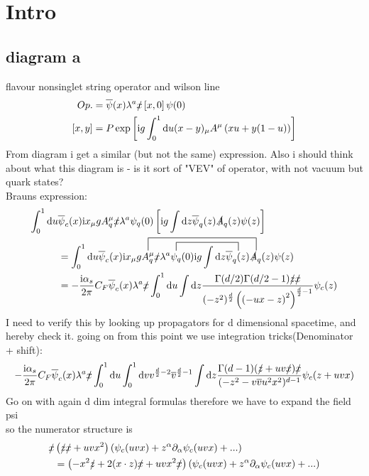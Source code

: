 \section{Intro}
\subsection{diagram a}
flavour nonsinglet string operator and wilson line
\begin{align}
	Op. 
	&= \overline\psi (x) \lambda^a \slashed x \left[x,0 \right] \psi (0)
	\\
	\left[x,y \right] 
	&= P \exp\left[\text{i} g \int_0^1 \text{d} u (x-y)_\mu A^\mu\left(xu+y(1-u)\right)\right]
\end{align}
From diagram i get a similar (but not the same) expression. Also i should think about what this diagram is - is it sort of "VEV" of operator, with not vacuum but quark states?
\\
Brauns expression:
\begin{align}
	\int_{0}^{1}\dx u & \psibarc(x) \imag x_\mu g A_q^\mu \slashed x \lambda^a \psiq(0) \left[\imag g \int \dx z \psibarq (z) \slashed A_q(z) \psi(z) \right]
	\\
	&=
	\int_{0}^{1}\dx u \psibarc(x) \imag x_\mu g 
	\contraction[3ex]{}{A_q^\mu}{\slashed x \lambda^a \psiq(0) \imag g \int \dx z \psibarq (z)}{\slashed A_q}
	\contraction[2ex]{A_q^\mu \slashed x \lambda^a }{\psiq}{(0) \imag g \int \dx z }{\psibarq (z)}
	A_q^\mu \slashed x \lambda^a \psiq(0) \imag g \int \dx z \psibarq (z) \slashed A_q(z) \psi(z)
	\\
	&=
	-\frac{\imag \as}{2\pi} C_F \psibarc(x) \lambda^a \slashed x \int _0 ^1 \dx u \int \dx z \frac{ \Gamma(d/2) \Gamma(d/2-1) \slashed z \slashed x}{(-z^2)^{\frac{d}{2}}\left(\left(-ux-z\right)^2\right)^{\frac{d}{2}-1}}\psic(z)
\end{align}
I need to verify this by looking up propagators for d dimensional spacetime, and hereby check it. going on from this point we use integration tricks(Denominator + shift):
\begin{align}
	-\frac{\text{i} \alpha_s}{2\pi} C_F \overline\psi_c(x) \lambda^a \slashed x \int _0 ^1 \text{d} u \int_0^1 \text{d} v v^{\frac{d}{2}-2} \overline v ^{\frac{d}{2}-1}\int \text{d} z \frac{ \Gamma(d-1) (\slashed z+uv\slashed x) \slashed x}{(-z^2 -v \overline v u^2 x^2)^{d-1}}\psi_c(z+uvx)
\end{align}
Go on with again d dim integral formulas
therefore we have to expand the field psi\\
so the numerator structure is
\begin{align}
	\slashed x &\left(\slashed z \slashed x +uv x^2 \right) \left( \psi_c(uvx) + z^\alpha \partial_\alpha \psi_c(uvx)+...\right)
	\\
	&=
	\left(-x^2 \slashed z + 2(x\cdot z) \slashed x  +uv x^2 \slashed x \right) \left( \psi_c(uvx) + z^\alpha \partial_\alpha \psi_c(uvx)+...\right)
\end{align}
